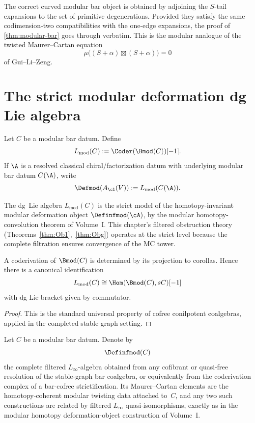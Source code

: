 \begin{remark}
The correct curved modular bar object is obtained by adjoining the $S$-tail expansions
to the set of primitive degenerations. Provided they satisfy the same codimension-two
compatibilities with the one-edge expansions, the proof of \cref{thm:modular-bar} goes
through verbatim. This is the modular analogue of the twisted Maurer--Cartan equation
\[
\mu\big((S+\alpha)\boxtimes (S+\alpha)\big)=0
\]
of Gui--Li--Zeng.
\end{remark}

\section{The strict modular deformation dg Lie algebra}

\begin{definition}
Let $C$ be a modular bar datum. Define
\[
L_{\mathrm{mod}}(C):=\Coder(\Bmod(C))[-1].
\]
If $\A$ is a resolved classical chiral/factorization datum with underlying modular bar datum
$C(\A)$, write
\[
\Defmod(A_{\cl}(V)):=L_{\mathrm{mod}}(C(\A)).
\]
\end{definition}

\begin{remark}
\label{rem:lmod-strict-model}
The dg~Lie algebra $L_{\mathrm{mod}}(C)$ is the strict model of
the homotopy-invariant modular deformation object
$\Definfmod(\cA)$, by the modular homotopy-convolution theorem of
Volume~I.
This chapter's filtered obstruction theory
(Theorems~\ref{thm:Ob1},~\ref{thm:Obg}) operates at the strict
level because the complete filtration ensures convergence of the
MC tower.
\end{remark}

\begin{proposition}
A coderivation of $\Bmod(C)$ is determined by its projection to corollas. Hence there is
a canonical identification
\[
L_{\mathrm{mod}}(C)\cong \Hom(\Bmod(C),sC)[-1]
\]
with dg Lie bracket given by commutator.
\end{proposition}

\begin{proof}
This is the standard universal property of cofree conilpotent coalgebras, applied in the
completed stable-graph setting.
\end{proof}

\begin{construction}
\label{const:vol2-homotopy-modular-object}
Let $C$ be a modular bar datum. Denote by
\[
\Definfmod(C)
\]
the complete filtered $L_\infty$-algebra obtained from any cofibrant or
quasi-free resolution of the stable-graph bar coalgebra, or equivalently
from the coderivation complex of a bar-cofree strictification. Its
Maurer--Cartan elements are the homotopy-coherent modular twisting data
attached to~$C$, and any two such constructions are related by filtered
$L_\infty$ quasi-isomorphisms, exactly as in the modular homotopy
deformation-object construction of Volume~I.
\end{construction}


